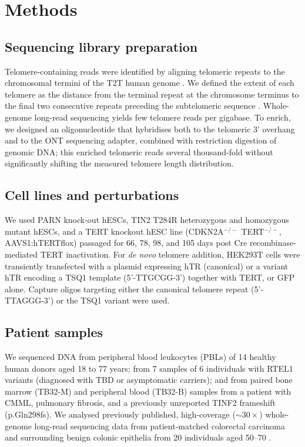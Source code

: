\documentclass[11pt]{article}
\begin{document}
\section{Methods}
\subsection{Sequencing library preparation}
Telomere-containing reads were identified by aligning telomeric repeats to the chromosomal termini of the T2T human genome \citep{r28}. We defined the extent of each telomere as the distance from the terminal repeat at the chromosome terminus to the final two consecutive repeats preceding the subtelomeric sequence \citep{r26}. Whole-genome long-read sequencing yields few telomere reads per gigabase. To enrich, we designed an oligonucleotide that hybridises both to the telomeric 3' overhang and to the ONT sequencing adapter, combined with restriction digestion of genomic DNA; this enriched telomeric reads several thousand-fold without significantly shifting the measured telomere length distribution.

\subsection{Cell lines and perturbations}
We used PARN knock-out hESCs, TIN2 T284R heterozygous and homozygous mutant hESCs, and a TERT knockout hESC line (CDKN2A$^{-/-}$ TERT$^{-/-}$, AAVS1:hTERTflox) passaged for 66, 78, 98, and 105 days post Cre recombinase-mediated TERT inactivation. For \textit{de novo} telomere addition, HEK293T cells were transiently transfected with a plasmid expressing hTR (canonical) or a variant hTR encoding a TSQ1 template (5'-TTGCGG-3') together with TERT, or GFP alone. Capture oligos targeting either the canonical telomere repeat (5'-TTAGGG-3') or the TSQ1 variant were used.

\subsection{Patient samples}
We sequenced DNA from peripheral blood leukocytes (PBLs) of 14 healthy human donors aged 18 to 77 years; from 7 samples of 6 individuals with RTEL1 variants (diagnosed with TBD or asymptomatic carriers); and from paired bone marrow (TB32-M) and peripheral blood (TB32-B) samples from a patient with CMML, pulmonary fibrosis, and a previously unreported TINF2 frameshift (p.Gln298fs). We analysed previously published, high-coverage ($\sim 30\times$) whole-genome long-read sequencing data from patient-matched colorectal carcinoma and surrounding benign colonic epithelia from 20 individuals aged 50--70 \citep{r34}.
\end{document}
